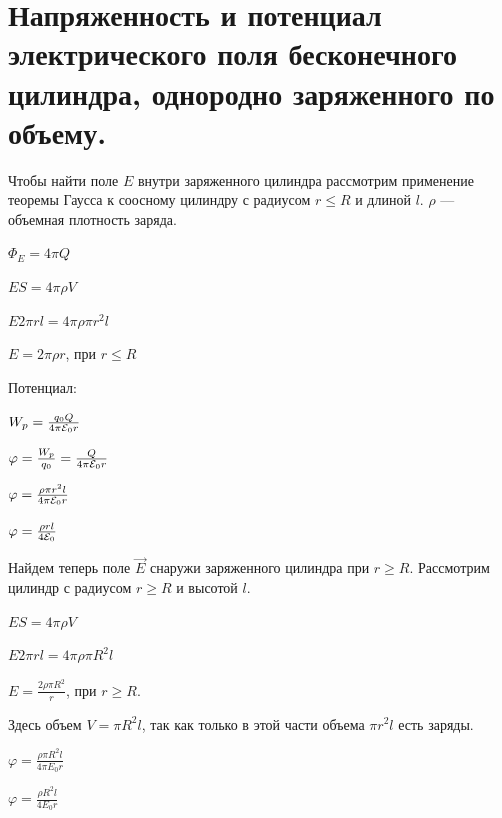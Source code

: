 \documentclass[12pt]{report}
\begin{document}
\section{Напряженность и потенциал электрического поля бесконечного цилиндра, однородно заряженного по объему.}
Чтобы найти поле $E$ внутри заряженного цилиндра рассмотрим применение теоремы Гаусса к соосному цилиндру с радиусом $r \leq R$ и длиной $l$. $\rho$ --- объемная плотность заряда.
\begin{center}
    $\Phi_E = 4 \pi Q$
\end{center}
\begin{center}
    $ES = 4 \pi \rho V$
\end{center}
\begin{center}
    $E 2\pi r l = 4 \pi \rho \pi r^2 l$
\end{center}
\begin{center}
    $E = 2 \pi \rho r$, при $r \leq R$
\end{center}
\par Потенциал:
\begin{center}
    $W_p = \frac{q_0 Q}{4 \pi \varE_0 r}$
\end{center}
\begin{center}
    $\varphi = \frac{W_p}{q_0} = \frac{Q}{4 \pi \varE_0 r}$
\end{center}
\begin{center}
    $\varphi = \frac{\rho \pi r^2 l}{4 \pi \varE_0 r} $
\end{center}
\begin{center}
    $\varphi = \frac{\rho r l}{4 \varE_0}$
\end{center}
Найдем теперь поле $\vec{E}$ снаружи заряженного цилиндра при $r \geq R$.
Рассмотрим цилиндр с радиусом $r \geq R$ и высотой $l$.
\begin{center}
    $ES = 4 \pi \rho V$
\end{center}
\begin{center}
    $E 2 \pi r l = 4 \pi \rho \pi R^2 l$
\end{center}
\begin{center}
    $E = \frac{2 \rho \pi R^2}{r}$, при $r \geq R$.
\end{center}
Здесь объем $V = \pi R^2 l$, так как только в этой части объема $\pi r^2 l$ есть
заряды.
\begin{center}
    $\varphi = \frac{\rho \pi R^2 l}{4 \pi E_0 r} $
\end{center}
\begin{center}
    $\varphi = \frac{\rho R^2 l}{4 E_0 r} $
\end{center}
\end{document}
